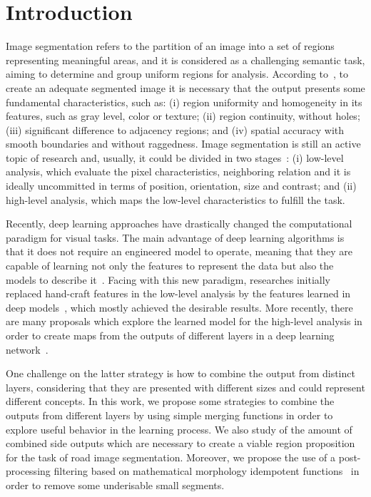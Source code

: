 \section{Introduction}
\label{sec:intro}

Image segmentation refers to the partition of an image into a set of regions representing  meaningful areas, and it is considered as a challenging semantic task, aiming to determine and group uniform regions for analysis. According to~\cite{DOMINGUEZ}, to create an adequate segmented image it is necessary that the output presents some fundamental characteristics, such as: (i) region uniformity and homogeneity in  its features, such as gray level, color or texture; (ii) region continuity, without holes; (iii) significant difference to adjacency regions; and (iv) spatial accuracy with smooth boundaries and without raggedness. Image segmentation is still an active topic of research and, usually, it could be divided in two stages~\cite{guigues06}: (i) low-level analysis, which evaluate the pixel characteristics, neighboring relation and it is ideally uncommitted in terms of position, orientation, size and contrast; and (ii) high-level analysis, which maps the low-level characteristics to fulfill the task.  

Recently, deep learning approaches have drastically changed the computational paradigm for visual tasks. The main advantage of deep learning algorithms is that it does not require an engineered model to operate, meaning that they are capable of learning not only the features to represent the data but also the models to describe it~\cite{goodfellow16}. Facing with this new paradigm, researches initially replaced  hand-craft features in the low-level analysis by the features learned in deep models~\cite{farabet2013,simonyan2014,lee2015}, which mostly achieved the desirable results. More recently, there are many proposals which explore the learned model for the high-level analysis in order to create maps from the outputs of different layers in a deep learning network~\cite{xie2017,cheng2016,maninis2017,liu2017}. 

One challenge on the latter strategy is how to combine the output from distinct layers, considering that they are presented with different sizes and could represent different concepts. In this work, we propose some strategies to combine the outputs from different layers by using simple merging functions in order to explore useful behavior in the learning process. We also study of the amount of combined side outputs which are necessary to create a viable region proposition for the task of road image segmentation. Moreover, we propose the use of a post-processing filtering based on mathematical morphology idempotent functions~\cite{najman13} in order to remove some underisable small segments.

